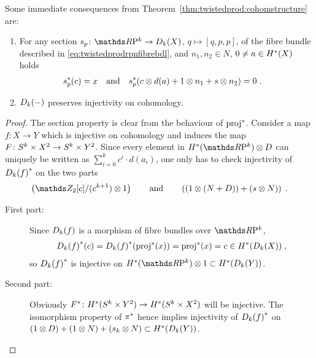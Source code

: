 \begin{Cor}
  Some immediate consequences from
  Theorem~\ref{thm:twistedprod:cohomstructure} are:
  \begin{enumerate}
  \item
    For any section $s_p\colon\RP k\to\Twistedprod{k}{X}$, $q\mapsto[q,p,p]$,
    of the fibre bundle described in
    \eqref{eq:twistedprodrpnfibrebdl}, and $n_1,n_2\in N$, $0\neq a\in H^*(X)$ holds
    \begin{align}\label{eq:twistedprodcohom:section}
      {s}^*_p(c) &= x
      &\text{and}&
      &{s}^*_p(c\otimes d(a) + 1\otimes n_1 + s\otimes n_2) &= 0
                                                              \;.
    \end{align}
  \item\label{item:twistedprod:preservescohominj}
    $D_{k}({-})$ preserves injectivity on cohomology.
  \end{enumerate}
  \begin{proof}
    The section property is clear from the behaviour of ${\mathrm{proj}}^*$.
    Consider a map $f\colon X\to Y$ which is injective on cohomology
    and induces the map
    $F\colon S^{k}\times X^2\to S^{k}\times Y^2$.
    Since every element in $\H^*(\RP k)\otimes D$ can uniquely be
    written as $\sum_{i=0}^k c^i\cdot d(a_i)$,
    one only has to check injectivity of ${D_{k}({f})}^*$ on
    the two parts
    \begin{gather*}
      \left( \Zmod2[c]/(c^{k+1})\otimes 1 \right)
      \qquad\text{and}\qquad
      \left(
        (1\otimes (N+D)) + (s\otimes N)
      \right)
      \;.
    \end{gather*}
    \begin{description}
    \item[First part:]
      Since $D_{k}({f})$ is a morphism of fibre bundles over
      $\RP k$,
      \begin{gather*}
        {D_{k}({f})}^*(c)
        = {D_{k}({f})}^*({\mathrm{proj}}^*(x))
        = {\mathrm{proj}}^*(x)
        = c
        \in H^*(D_{k}({X}))
        \;,
      \end{gather*}
      so ${D_{k}({f})}^*$ is injective on
      $\H^*(\RP k)\otimes 1\subset\H^*(\Twistedprod k Y)$.
    \item[Second part:]
      Obviously
      ${F}^*\colon H^*(S^{k}\times Y^2)\to H^*(S^{k}\times X^2)$ 
      will be injective. The isomorphism property of ${\pi}^*$ hence
      implies injectivity of ${D_{k}({f})}^*$ on
      $(1\otimes D)+(1\otimes N)+(s_k\otimes N)\subset H^*(D_{k}({Y}))$.
      \qedhere
    \end{description}
  \end{proof}
\end{Cor}

